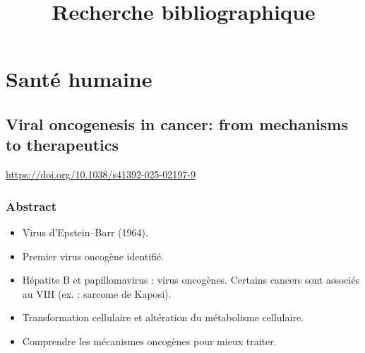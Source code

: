 \documentclass{article}
\title{Recherche bibliographique}
\author{}
\date{}
\begin{document}
\maketitle
\tableofcontents

\newpage
\section{Santé humaine}
    \subsection{Viral oncogenesis in cancer: from mechanisms to therapeutics}
    \noindent
    \url{https://doi.org/10.1038/s41392-025-02197-9}
        \subsubsection{Abstract}

\begin{itemize}
    \item Virus d'Epstein–Barr (1964).
    \item Premier virus oncogène identifié.
    \item Hépatite B et papillomavirus : virus oncogènes. Certains cancers sont associés au VIH (ex. : sarcome de Kaposi).
    \item Transformation cellulaire et altération du métabolisme cellulaire.
    \item Comprendre les mécanismes oncogènes pour mieux traiter.
\end{itemize}
\end{document}
